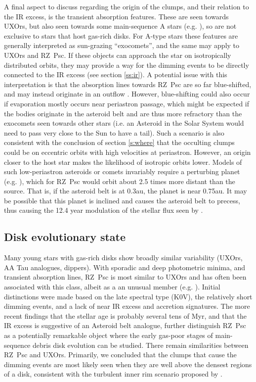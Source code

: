 \documentclass[]{rsos}
\begin{document}
A final aspect to discuss regarding the origin of the clumps, and their relation to the
IR excess, is the transient absorption features. These are seen towards UXOrs, but also
seen towards some main-sequence A stars
(e.g. \cite{1987A&A...185..267F,2013PASP..125..759W,2014A&A...561L..10K}), so are not
exclusive to stars that host gas-rich disks. For A-type stars these features are
generally interpreted as sun-grazing ``exocomets'', and the same may apply to UXOrs and
RZ~Psc. If these objects can approach the star on isotropically distributed orbits, they
may provide a way for the dimming events to be directly connected to the IR excess (see
section \ref{ss:ir}). A potential issue with this interpretation is that the absorption
lines towards RZ~Psc are so far blue-shifted, and may instead originate in an outflow
\cite{2013Ap.....56..453P}. However, blue-shifting could also occur if evaporation
mostly occurs near periastron passage, which might be expected if the bodies originate in
the asteroid belt and are thus more refractory than the exocomets seen towards other
stars (i.e. an Asteroid in the Solar System would need to pass very close to the Sun to
have a tail). Such a scenario is also consistent with the conclusion of section
\ref{s:where} that the occulting clumps could be on eccentric orbits with high velocities
at periastron. However, an origin closer to the host star makes the likelihood of
isotropic orbits lower. Models of such low-periastron asteroids or comets invariably
require a perturbing planet (e.g. \cite{1990A&A...236..202B,1996Icar..120..358B}),
which for RZ~Psc would orbit about 2.5 times more distant than the source. That is, if
the asteroid belt is at 0.3au, the planet is near 0.75au. It may be possible that this
planet is inclined and causes the asteroid belt to precess, thus causing the 12.4 year
modulation of the stellar flux seen by \cite{2013A&A...553L...1D}.

\subsection{Disk evolutionary state}\label{ss:evol}

Many young stars with gas-rich disks show broadly similar variability (UXOrs, AA Tau
analogues, dippers). With sporadic and deep photometric minima, and transient absorption
lines, RZ~Psc is most similar to UXOrs and has often been associated with this class,
albeit as a an unusual member (e.g. \cite{2010A&A...524A...8G}). Initial distinctions
were made based on the late spectral type (K0V), the relatively short dimming events, and
a lack of near IR excess and accretion signatures. The more recent findings that the
stellar age is probably several tens of Myr, and that the IR excess is suggestive of an
Asteroid belt analogue, further distinguish RZ~Psc as a potentially remarkable object
where the early gas-poor stages of main-sequence debris disk evolution can be
studied. There remain similarities between RZ~Psc and UXOrs. Primarily, we concluded that
the clumps that cause the dimming events are most likely seen when they are well above
the densest regions of a disk, consistent with the turbulent inner rim scenario proposed
by \cite{2003ApJ...594L..47D}.
\end{document}
